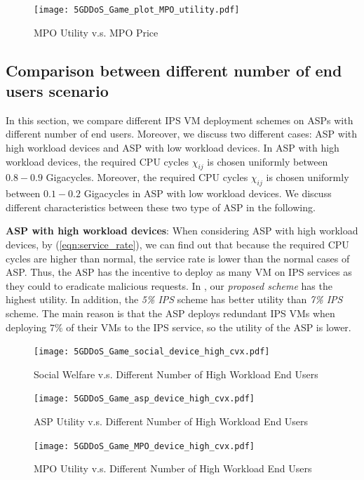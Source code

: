 \documentclass[conference]{IEEEtran}
\begin{document}
\begin{figure}[!ht]
  \texttt{[image: 5GDDoS\_Game\_plot\_MPO\_utility.pdf]}
\caption{MPO Utility v.s. MPO Price}
\label{fig:MPOutil}
\end{figure}

\subsection{Comparison between different number of end users scenario}
In this section, we compare different IPS VM deployment schemes on ASPs with different number of end users. Moreover, we discuss two different cases: ASP with high workload devices and ASP with low workload devices. In ASP with high workload devices, the required CPU cycles $\chi_{ij}$ is chosen uniformly between $0.8 - 0.9$ Gigacycles. Moreover, the required CPU cycles $\chi_{ij}$ is chosen uniformly between $0.1 - 0.2$ Gigacycles in ASP with low workload devices. We discuss different characteristics between these two type of ASP in the following. 

\textbf{ASP with high workload devices}: 
When considering ASP with high workload devices, by (\ref{eqn:service_rate}), we can find out that because the required CPU cycles are higher than normal, the service rate is lower than the normal cases of ASP. Thus, the ASP has the incentive to deploy as many VM on IPS services as they could to eradicate malicious requests. In , our \textit{proposed scheme} has the highest utility. In addition, the \textit{5\% IPS} scheme has better utility than \textit{7\% IPS} scheme. The main reason is that the ASP deploys redundant IPS VMs when deploying $7\%$ of their VMs to the IPS service, so the utility of the ASP is lower. 

\begin{figure}[!ht]
  \texttt{[image: 5GDDoS\_Game\_social\_device\_high\_cvx.pdf]}
    \caption{Social Welfare v.s. Different Number of High Workload End Users}
\label{fig:num_cmp_soc_high}
\end{figure}

\begin{figure}[!ht]
  \texttt{[image: 5GDDoS\_Game\_asp\_device\_high\_cvx.pdf]}
    \caption{ASP Utility v.s. Different Number of High Workload End Users}
\label{fig:num_cmp_asp_high}
\end{figure}

\begin{figure}[!ht]
  \texttt{[image: 5GDDoS\_Game\_MPO\_device\_high\_cvx.pdf]}
    \caption{MPO Utility v.s. Different Number of High Workload End Users}
\label{fig:num_cmp_mpo_high}
\end{figure}
\end{document}
